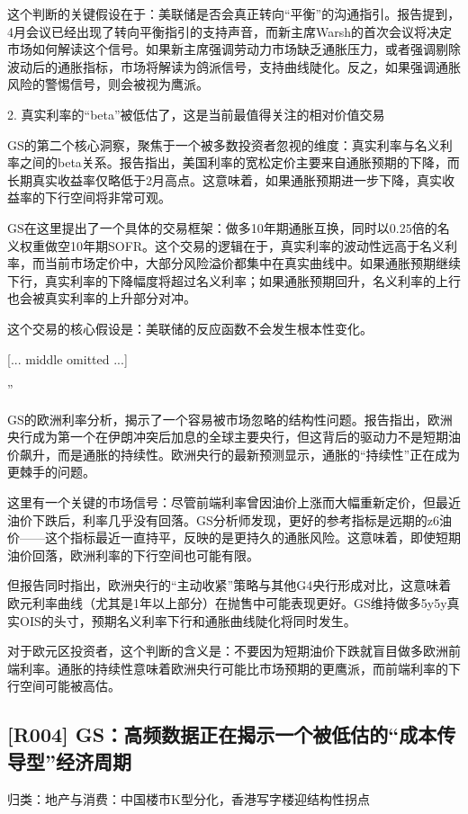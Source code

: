 \documentclass[11pt]{ctexart}
\begin{document}
这个判断的关键假设在于：美联储是否会真正转向“平衡”的沟通指引。报告提到，4月会议已经出现了转向平衡指引的支持声音，而新主席Warsh的首次会议将决定市场如何解读这个信号。如果新主席强调劳动力市场缺乏通胀压力，或者强调剔除波动后的通胀指标，市场将解读为鸽派信号，支持曲线陡化。反之，如果强调通胀风险的警惕信号，则会被视为鹰派。

2. 真实利率的“beta”被低估了，这是当前最值得关注的相对价值交易

GS的第二个核心洞察，聚焦于一个被多数投资者忽视的维度：真实利率与名义利率之间的beta关系。报告指出，美国利率的宽松定价主要来自通胀预期的下降，而长期真实收益率仅略低于2月高点。这意味着，如果通胀预期进一步下降，真实收益率的下行空间将非常可观。

GS在这里提出了一个具体的交易框架：做多10年期通胀互换，同时以0.25倍的名义权重做空10年期SOFR。这个交易的逻辑在于，真实利率的波动性远高于名义利率，而当前市场定价中，大部分风险溢价都集中在真实曲线中。如果通胀预期继续下行，真实利率的下降幅度将超过名义利率；如果通胀预期回升，名义利率的上行也会被真实利率的上升部分对冲。

这个交易的核心假设是：美联储的反应函数不会发生根本性变化。

[... middle omitted ...]

”

GS的欧洲利率分析，揭示了一个容易被市场忽略的结构性问题。报告指出，欧洲央行成为第一个在伊朗冲突后加息的全球主要央行，但这背后的驱动力不是短期油价飙升，而是通胀的持续性。欧洲央行的最新预测显示，通胀的“持续性”正在成为更棘手的问题。

这里有一个关键的市场信号：尽管前端利率曾因油价上涨而大幅重新定价，但最近油价下跌后，利率几乎没有回落。GS分析师发现，更好的参考指标是远期的z6油价——这个指标最近一直持平，反映的是更持久的通胀风险。这意味着，即使短期油价回落，欧洲利率的下行空间也可能有限。

但报告同时指出，欧洲央行的“主动收紧”策略与其他G4央行形成对比，这意味着欧元利率曲线（尤其是1年以上部分）在抛售中可能表现更好。GS维持做多5y5y真实OIS的头寸，预期名义利率下行和通胀曲线陡化将同时发生。

对于欧元区投资者，这个判断的含义是：不要因为短期油价下跌就盲目做多欧洲前端利率。通胀的持续性意味着欧洲央行可能比市场预期的更鹰派，而前端利率的下行空间可能被高估。

\subsection{[R004] GS：高频数据正在揭示一个被低估的“成本传导型”经济周期}
{\small\color{refgray}归类：地产与消费：中国楼市K型分化，香港写字楼迎结构性拐点}
\end{document}
